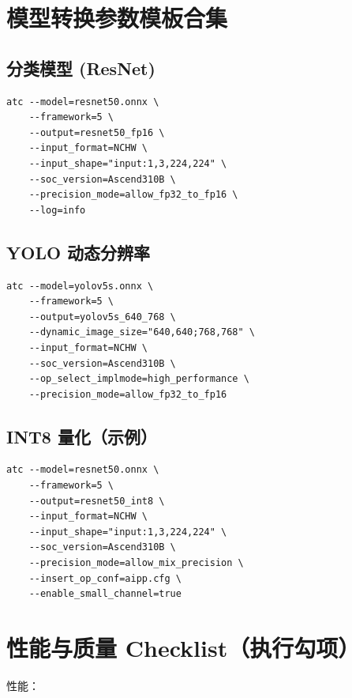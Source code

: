 \section{模型转换参数模板合集}\label{src-appendix-appendix6-h3}

\subsection{分类模型 (ResNet)}\label{src-appendix-appendix6-h4}

\begin{lstlisting}
atc --model=resnet50.onnx \
    --framework=5 \
    --output=resnet50_fp16 \
    --input_format=NCHW \
    --input_shape="input:1,3,224,224" \
    --soc_version=Ascend310B \
    --precision_mode=allow_fp32_to_fp16 \
    --log=info
\end{lstlisting}

\subsection{YOLO 动态分辨率}\label{src-appendix-appendix6-h5}

\begin{lstlisting}
atc --model=yolov5s.onnx \
    --framework=5 \
    --output=yolov5s_640_768 \
    --dynamic_image_size="640,640;768,768" \
    --input_format=NCHW \
    --soc_version=Ascend310B \
    --op_select_implmode=high_performance \
    --precision_mode=allow_fp32_to_fp16
\end{lstlisting}

\subsection{INT8 量化（示例）}\label{src-appendix-appendix6-h6}

\begin{lstlisting}
atc --model=resnet50.onnx \
    --framework=5 \
    --output=resnet50_int8 \
    --input_format=NCHW \
    --input_shape="input:1,3,224,224" \
    --soc_version=Ascend310B \
    --precision_mode=allow_mix_precision \
    --insert_op_conf=aipp.cfg \
    --enable_small_channel=true
\end{lstlisting}

\section{性能与质量
Checklist（执行勾项）}\label{src-appendix-appendix6-h7}

性能：

